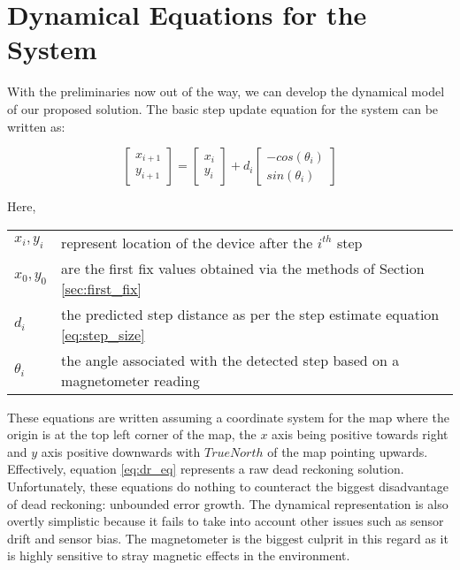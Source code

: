 \section{Dynamical Equations for the System}

With the preliminaries now out of the way, we can develop the dynamical model
of our proposed solution. The basic step update equation for the system 
can be written as:

\begin{equation}\label{eq:dr_eq}
\begin{bmatrix}x_{i+1}\\
y_{i+1}
\end{bmatrix} = \begin{bmatrix}x_{i}\\
y_{i}
\end{bmatrix}  + d{}_{i} \begin{bmatrix}-cos(\theta_{i})\\
sin(\theta_{i})
\end{bmatrix} 
\end{equation}

Here,\\
\begin{tabular}{p{1in} p{4in}}
$x_i, y_i$          &   represent location of the device after the $i^{th}$ step\\
$x_0, y_0$          &   are the first fix values obtained via the methods of Section \ref{sec:first_fix}\\
$d_i$               &   the predicted step distance as per the step estimate equation \eqref{eq:step_size}\\
$\theta_i$          &   the angle associated with the detected step based on a magnetometer reading\\
\end{tabular}

These equations are written assuming a coordinate system for the map where the 
origin is at the top left corner of the map, the $x$ axis being
positive towards right and $y$ axis positive downwards with $TrueNorth$ of the map
pointing upwards. Effectively, equation \eqref{eq:dr_eq} represents a raw dead reckoning
solution. Unfortunately, these equations do nothing to counteract the biggest
disadvantage of dead reckoning: unbounded error growth. The dynamical
representation is also overtly simplistic because it fails to take into account
other issues such as sensor drift and sensor bias. The magnetometer is the
biggest culprit in this regard as it is highly sensitive to stray magnetic
effects in the environment.

